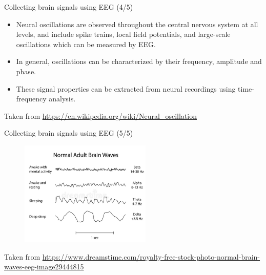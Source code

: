\documentclass{beamer}
\begin{document}
\begin{frame}
{\centerline{Collecting brain signals using EEG (4/5)}}
 \begin{itemize}
     \item Neural oscillations are observed throughout the central nervous system at all levels, and include spike trains, local field potentials, and large-scale oscillations which can be measured by EEG.
     \item In general, oscillations can be characterized by their frequency, amplitude and phase.
     \item These signal properties can be extracted from neural recordings using time-frequency analysis.
 \end{itemize}
   \begin{center}
       \tiny{Taken from \url{https://en.wikipedia.org/wiki/Neural_oscillation}}
   \end{center}
\end{frame}

\begin{frame}
{\centerline{Collecting brain signals using EEG (5/5)}}
    \begin{figure}
        \centering
        \includegraphics[height=5cm]{P2023.AIBCCSS.BrainSignals/normal-brain-waves-eeg-29444815.jpg}
    \end{figure}
    \begin{center}
    \tiny{Taken from \url{https://www.dreamstime.com/royalty-free-stock-photo-normal-brain-waves-eeg-image29444815}}
    \end{center}  
\end{frame}
\end{document}

